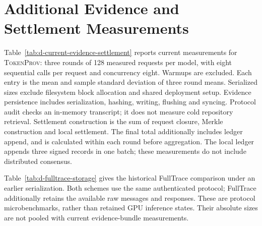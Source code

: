 \section{Additional Evidence and Settlement Measurements}
\label{app:d-evidence-settlement}
Table~\ref{tab:d-current-evidence-settlement} reports current measurements for
\textsc{TokenProv}: three rounds of 128 measured requests per model, with eight
sequential calls per request and concurrency eight. Warmups are excluded.
Each entry is the mean and sample standard deviation of three round means.
Serialized sizes exclude filesystem block allocation and shared deployment setup.
Evidence persistence includes serialization, hashing, writing, flushing and syncing.
Protocol audit checks an in-memory transcript; it does not measure cold repository
retrieval. Settlement construction is the sum of request closure, Merkle
construction and local settlement. The final total additionally includes ledger
append, and is calculated within each round before aggregation.
The local ledger appends three signed records in one batch; these measurements
do not include distributed consensus.


Table~\ref{tab:d-fulltrace-storage} gives the historical FullTrace comparison
under an earlier serialization. Both schemes use the same authenticated protocol;
FullTrace additionally retains the available raw messages and responses.
These are protocol microbenchmarks, rather than retained GPU inference states.
Their absolute sizes are not pooled with current evidence-bundle measurements.

